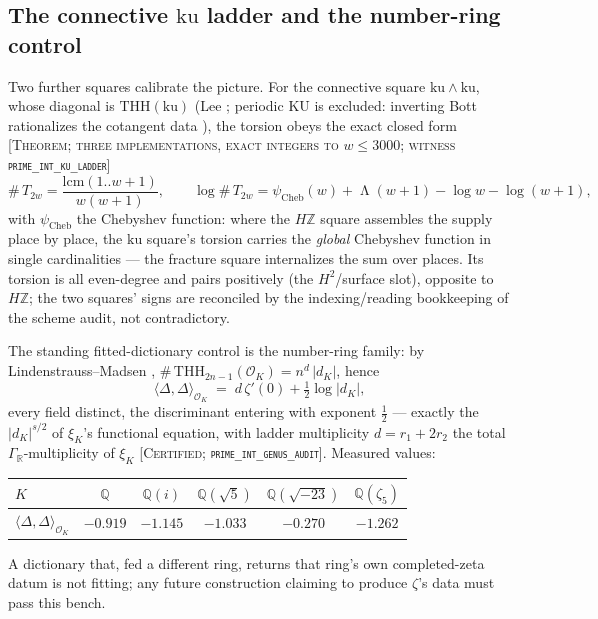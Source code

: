\documentclass[11pt,reqno]{amsart}
\theoremstyle{plain}
\theoremstyle{definition}
\theoremstyle{remark}
\newcommand{\R}{\mathbb{R}}
\newcommand{\Z}{\mathbb{Z}}
\newcommand{\Q}{\mathbb{Q}}
\newcommand{\THH}{\mathrm{THH}}
\newcommand{\HZ}{H\Z}
\newcommand{\ku}{\mathrm{ku}}
\newcommand{\KU}{\mathrm{KU}}
\newcommand{\grade}[1]{\textup{[\textsc{#1}]}}
\DeclareMathOperator{\Lam}{\Lambda}
\begin{document}
\subsection{The connective \texorpdfstring{$\ku$}{ku} ladder and the number-ring control}
\label{subsec:ku}

Two further squares calibrate the picture. For the connective square $\ku \wedge \ku$, whose
diagonal is $\THH(\ku)$ (Lee \cite{Lee22}; periodic $\KU$ is excluded: inverting Bott
rationalizes the cotangent data \cite{Stonek18}), the torsion obeys the exact closed form
\grade{Theorem; three implementations, exact integers to $w \le 3000$;
witness \texttt{prime\_\allowbreak int\_\allowbreak ku\_\allowbreak ladder}}
\[
\#\,T_{2w} = \frac{\mathrm{lcm}(1..w{+}1)}{w(w+1)}, \qquad
\log \#\,T_{2w} = \psi_{\mathrm{Cheb}}(w) + \Lam(w+1) - \log w - \log(w+1),
\]
with $\psi_{\mathrm{Cheb}}$ the Chebyshev function: where the $\HZ$ square assembles the
supply place by place, the $\ku$ square's torsion carries the \emph{global} Chebyshev
function in single cardinalities --- the fracture square internalizes the sum over places.
Its torsion is all even-degree and pairs positively (the $H^2$/surface slot), opposite to
$\HZ$; the two squares' signs are reconciled by the indexing/reading bookkeeping of the
scheme audit, not contradictory.

The standing fitted-dictionary control is the number-ring family: by Lindenstrauss--Madsen
\cite{LM00}, $\#\,\THH_{2n-1}(\mathcal{O}_K) = n^d\,|d_K|$, hence
\[
\langle \Delta, \Delta\rangle_{\mathcal{O}_K} \;=\; d\,\zeta'(0) + \tfrac12 \log |d_K|,
\]
every field distinct, the discriminant entering with exponent $\tfrac12$ --- exactly the
$|d_K|^{s/2}$ of $\xi_K$'s functional equation, with ladder multiplicity
$d = r_1 + 2r_2$ the total $\Gamma_\R$-multiplicity of $\xi_K$
\grade{Certified; \texttt{prime\_\allowbreak int\_\allowbreak genus\_\allowbreak audit}}.
Measured values:
\begin{center}
\begin{tabular}{lccccc}
\toprule
$K$ & $\Q$ & $\Q(i)$ & $\Q(\sqrt5)$ & $\Q(\sqrt{-23})$ & $\Q(\zeta_5)$ \\
\midrule
$\langle\Delta,\Delta\rangle_{\mathcal{O}_K}$ & $-0.919$ & $-1.145$ & $-1.033$ & $-0.270$
& $-1.262$ \\
\bottomrule
\end{tabular}
\end{center}
A dictionary that, fed a different ring, returns that ring's own completed-zeta datum is not
fitting; any future construction claiming to produce $\zeta$'s data must pass this bench.
\end{document}

